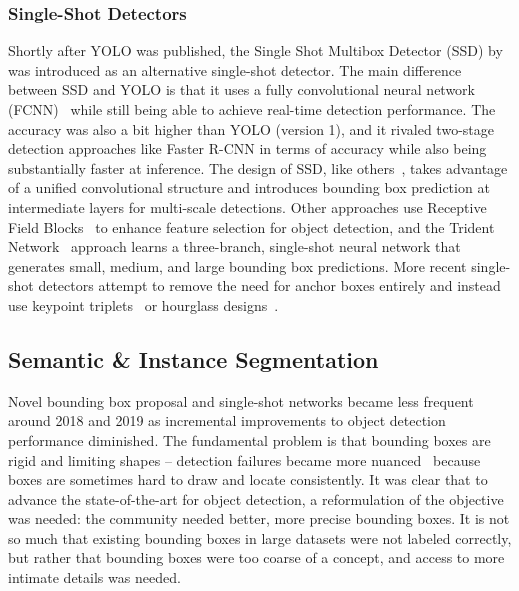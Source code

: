 \subsubsection{Single-Shot Detectors}

Shortly after YOLO was published, the Single Shot Multibox Detector (SSD) by~\cite{liu_ssd:_2016} was introduced as an alternative single-shot detector.  The main difference between SSD and YOLO is that it uses a fully convolutional neural network (FCNN)~\cite{long_fully_2015} while still being able to achieve real-time detection performance.  The accuracy was also a bit higher than YOLO (version 1), and it rivaled two-stage detection approaches like Faster R-CNN in terms of accuracy while also being substantially faster at inference.  The design of SSD, like others~\cite{shen_dsod_2017,li_tiny-dsod_2018,lin_focal_2018,bell_inside-outside_2016}, takes advantage of a unified convolutional structure and introduces bounding box prediction at intermediate layers for multi-scale detections.  Other approaches use Receptive Field Blocks~\cite{liu_receptive_2018} to enhance feature selection for object detection, and the Trident Network~\cite{li_scale-aware_2019} approach learns a three-branch, single-shot neural network that generates small, medium, and large bounding box predictions.  More recent single-shot detectors attempt to remove the need for anchor boxes entirely and instead use keypoint triplets~\cite{duan_centernet_2019} or hourglass designs~\cite{melekhov_image-based_2017,newell_stacked_2016,yang_stacked_2017}.

\subsection{Semantic \& Instance Segmentation}

Novel bounding box proposal and single-shot networks became less frequent around 2018 and 2019 as incremental improvements to object detection performance diminished.  The fundamental problem is that bounding boxes are rigid and limiting shapes -- detection failures became more nuanced~\cite{redmon_yolov3_2018} because boxes are sometimes hard to draw and locate consistently.  It was clear that to advance the state-of-the-art for object detection, a reformulation of the objective was needed: the community needed better, more precise bounding boxes.  It is not so much that existing bounding boxes in large datasets were not labeled correctly, but rather that bounding boxes were too coarse of a concept, and access to more intimate details was needed.

